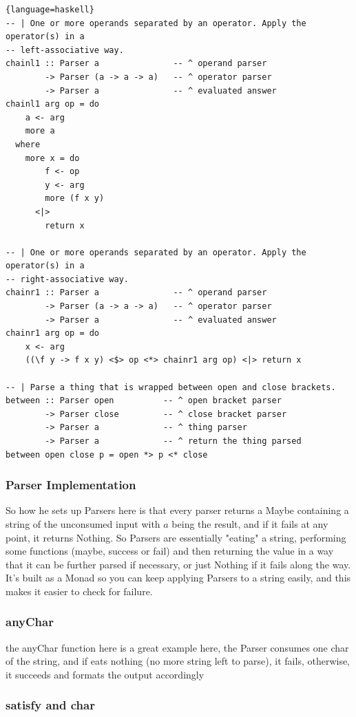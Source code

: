 \documentclass[12pt]{article}
\begin{document}
\begin{lstlisting}{language=haskell}
-- | One or more operands separated by an operator. Apply the operator(s) in a
-- left-associative way.
chainl1 :: Parser a               -- ^ operand parser
        -> Parser (a -> a -> a)   -- ^ operator parser
        -> Parser a               -- ^ evaluated answer
chainl1 arg op = do
    a <- arg
    more a
  where
    more x = do
        f <- op
        y <- arg
        more (f x y)
      <|>
        return x

-- | One or more operands separated by an operator. Apply the operator(s) in a
-- right-associative way.
chainr1 :: Parser a               -- ^ operand parser
        -> Parser (a -> a -> a)   -- ^ operator parser
        -> Parser a               -- ^ evaluated answer
chainr1 arg op = do
    x <- arg
    ((\f y -> f x y) <$> op <*> chainr1 arg op) <|> return x

-- | Parse a thing that is wrapped between open and close brackets.
between :: Parser open          -- ^ open bracket parser
        -> Parser close         -- ^ close bracket parser
        -> Parser a             -- ^ thing parser
        -> Parser a             -- ^ return the thing parsed
between open close p = open *> p <* close
\end{lstlisting}

\subsubsection{Parser Implementation}


So how he sets up Parsers here is that every parser returns a Maybe containing a string of the unconsumed input with $a$ being the result, and if it fails at any point, it returns Nothing. So Parsers are essentially "eating" a string, performing some functions (maybe, success or fail) and then returning the value in a way that it can be further parsed if necessary, or just Nothing if it fails along the way. It's built as a Monad so you can keep applying Parsers to a string easily, and this makes it easier to check for failure.

\subsubsection{anyChar}

the anyChar function here is a great example here, the Parser consumes one char of the string, and if eats nothing (no more string left to parse), it fails, otherwise, it succeeds and formats the output accordingly

\subsubsection{satisfy and char}
\end{document}
